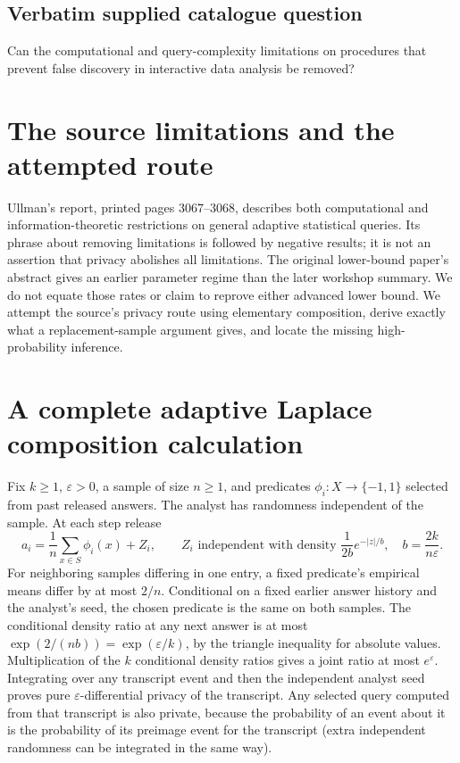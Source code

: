 \documentclass[11pt]{article}
\begin{document}
\subsection{Verbatim supplied catalogue question}
Can the computational and query-complexity limitations on procedures that prevent false discovery in interactive data analysis be removed?

\section{The source limitations and the attempted route}
Ullman's report, printed pages 3067--3068, describes both computational
and information-theoretic restrictions on general adaptive statistical
queries. Its phrase about removing limitations is followed by negative
results; it is not an assertion that privacy abolishes all limitations.
The original lower-bound paper's abstract gives an earlier parameter
regime than the later workshop summary. We do not equate those rates
or claim to reprove either advanced lower bound.
We attempt the source's privacy route using elementary composition,
derive exactly what a replacement-sample argument gives, and locate
the missing high-probability inference.

\section{A complete adaptive Laplace composition calculation}
Fix $k\ge1$, $\varepsilon>0$, a sample of size $n\ge1$, and predicates
$\phi_i:X\to\{-1,1\}$ selected from past released answers. The analyst
has randomness independent of the sample. At each step release
\[
a_i=\frac1n\sum_{x\in S}\phi_i(x)+Z_i,
\qquad Z_i\text{ independent with density }
\frac1{2b}e^{-|z|/b},\quad b=\frac{2k}{n\varepsilon}.
\]
For neighboring samples differing in one entry, a fixed predicate's
empirical means differ by at most $2/n$. Conditional on a fixed earlier
answer history and the analyst's seed, the chosen predicate is the
same on both samples. The conditional density ratio at any next answer
is at most $\exp(2/(nb))=\exp(\varepsilon/k)$, by the triangle
inequality for absolute values. Multiplication of the $k$ conditional
density ratios gives a joint ratio at most $e^\varepsilon$.
Integrating over any transcript event and then the independent analyst
seed proves pure $\varepsilon$-differential privacy of the transcript.
Any selected query computed from that transcript is also private,
because the probability of an event about it is the probability of its
preimage event for the transcript (extra independent randomness can be
integrated in the same way).
\end{document}
